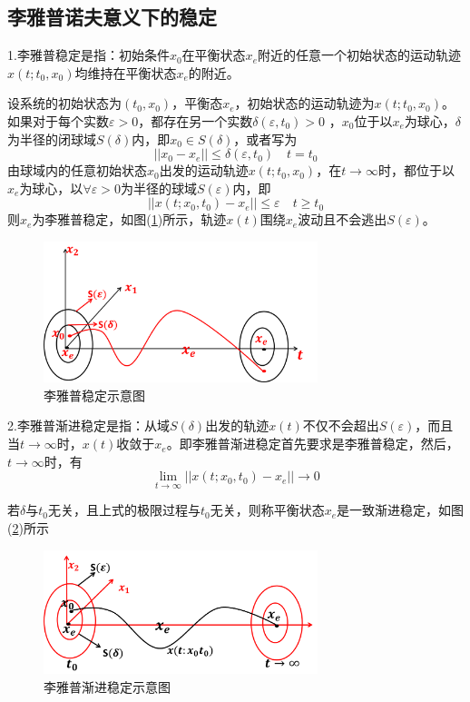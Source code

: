     \subsection{李雅普诺夫意义下的稳定}
        \par
        1.李雅普稳定是指：初始条件$x_0$在平衡状态$x_e$附近的任意一个初始状态的运动轨迹$x(t;t_0,x_0)$均维持在平衡状态$x_e$的附近。
        \par
        设系统的初始状态为$(t_0,x_0)$，平衡态$x_e$，初始状态的运动轨迹为$x(t;t_0,x_0)$。如果对于每个实数$\varepsilon>0$，都存在另一个实数$\delta (\varepsilon , t_0)>0$ ，$x_0$位于以$x_e$为球心，$\delta$为半径的闭球域$S(\delta)$内，即$x_0\in S(\delta)$，或者写为
        \[
            ||x_0-x_e||\leq \delta (\varepsilon,t_0)\quad t=t_0
        \]
        由球域内的任意初始状态$x_0$出发的运动轨迹$x(t;t_0,x_0)$，在$t\rightarrow\infty$时，都位于以$x_e$为球心，以$\forall \varepsilon >0$为半径的球域$S(\varepsilon)$内，即
        \[
            ||x(t;x_0,t_0)-x_e||\leq\varepsilon\quad t\geq t_0
        \]
        则$x_e$为李雅普稳定，如图(\ref{fig:李雅普稳定示意图})所示，轨迹$x(t)$围绕$x_e$波动且不会逃出$S(\varepsilon)$。
         \begin{figure}[H]
        \centering
        \includegraphics[width=8cm]{images/lypwdsyt.jpg}
        \caption{李雅普稳定示意图}
        \label{fig:李雅普稳定示意图}
        \end{figure}
        \par
        2.李雅普渐进稳定是指：从域$S(\delta)$出发的轨迹$x(t)$不仅不会超出$S(\varepsilon)$，而且当$t\rightarrow\infty$时，$x(t)$收敛于$x_e$。即李雅普渐进稳定首先要求是李雅普稳定，然后，$t\rightarrow\infty$时，有
        \[
            \lim_{t\rightarrow\infty}||x(t;x_0,t_0)-x_e||\rightarrow 0
        \]
        \par
        若$\delta$与$t_0$无关，且上式的极限过程与$t_0$无关，则称平衡状态$x_e$是一致渐进稳定，如图(\ref{fig:李雅普渐进稳定示意图})所示
         \begin{figure}[H]
        \centering
        \includegraphics[width=8cm]{images/lypjjwdsyt.jpg}
        \caption{李雅普渐进稳定示意图}
        \label{fig:李雅普渐进稳定示意图}
        \end{figure}
